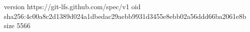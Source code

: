 version https://git-lfs.github.com/spec/v1
oid sha256:4c00a8c2d1389d024a1dbedac29aebb9931d3455e8ebb02a56ddd66ba2061e8b
size 5566
